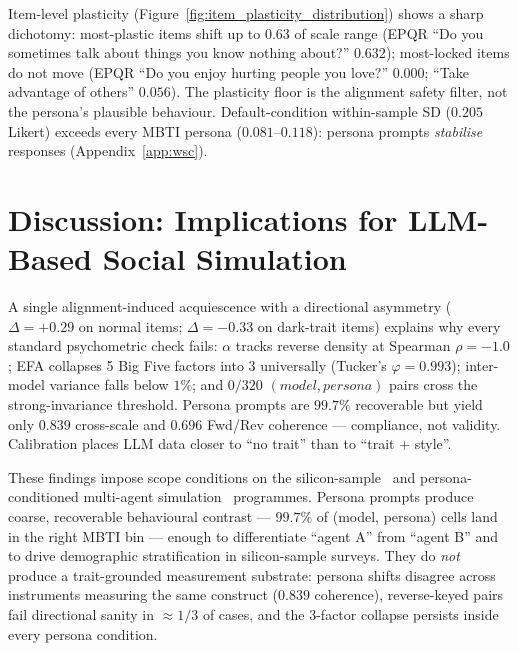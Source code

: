 \documentclass[11pt]{article}
\begin{document}
Item-level plasticity (Figure~\ref{fig:item_plasticity_distribution}) shows a sharp dichotomy: most-plastic items shift up to $0.63$ of scale range (EPQR ``Do you sometimes talk about things you know nothing about?'' $0.632$); most-locked items do not move (EPQR ``Do you enjoy hurting people you love?'' $0.000$; ``Take advantage of others'' $0.056$). The plasticity floor is the alignment safety filter, not the persona's plausible behaviour. Default-condition within-sample SD ($0.205$ Likert) exceeds every MBTI persona ($0.081$--$0.118$): persona prompts \emph{stabilise} responses (Appendix~\ref{app:wsc}).


\section{Discussion: Implications for {LLM-Based} Social Simulation}
\label{sec:conclusion}

A single alignment-induced acquiescence with a directional asymmetry ($\Delta = +0.29$ on normal items; $\Delta = -0.33$ on dark-trait items) explains why every standard psychometric check fails: $\alpha$ tracks reverse density at Spearman $\rho = -1.0$; EFA collapses 5 Big Five factors into 3 universally (Tucker's $\varphi = 0.993$); inter-model variance falls below $1\%$; and $0/320$ $(model, persona)$ pairs cross the strong-invariance threshold. Persona prompts are $99.7\%$ recoverable but yield only $0.839$ cross-scale and $0.696$ Fwd/Rev coherence --- compliance, not validity. Calibration places LLM data closer to ``no trait'' than to ``trait $+$ style''.

These findings impose scope conditions on the silicon-sample~\citep{argyle2023one,horton2023homo,ferreira2025matching} and persona-conditioned multi-agent simulation~\citep{chuang2023simulating,cau2025language,chuang2025debate,park2023generative} programmes. Persona prompts produce coarse, recoverable behavioural contrast --- $99.7\%$ of (model, persona) cells land in the right MBTI bin --- enough to differentiate ``agent A'' from ``agent B'' and to drive demographic stratification in silicon-sample surveys. They do \emph{not} produce a trait-grounded measurement substrate: persona shifts disagree across instruments measuring the same construct ($0.839$ coherence), reverse-keyed pairs fail directional sanity in ${\approx}1/3$ of cases, and the 3-factor collapse persists inside every persona condition.
\end{document}
